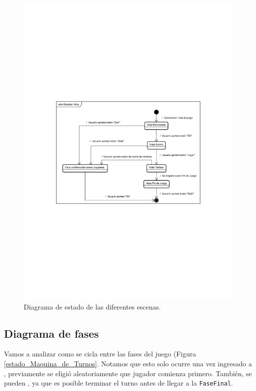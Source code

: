 	\begin{figure}[H]
		\centering
		\includegraphics[scale=0.9]{includes/estado_Estados_Vista}
		\caption{Diagrama de estado de las diferentes escenas.}
		\label{estado_Estados_Vista}
	\end{figure}
	
	\subsection{Diagrama de fases}
	
	Vamos a analizar como se cicla entre las fases del juego (Figura \ref{estado_Maquina_de_Turnos}. Notamos que esto solo ocurre una vez ingresado a , previamente se eligió aleatoriamente que jugador comienza primero. También, se pueden , ya que es posible terminar el turno antes de llegar a la \texttt{FaseFinal}.
	
